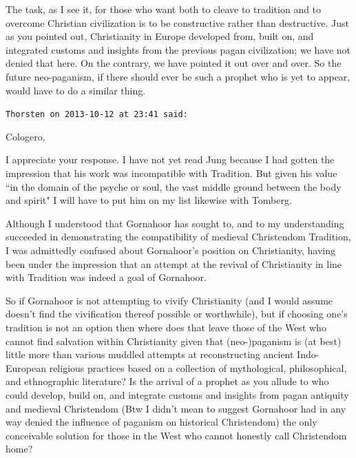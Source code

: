 \begin{footnotesize}
\begin{sffamily}
The task, as I see it, for those who want both to cleave to tradition and to overcome Christian civilization is to be
constructive rather than destructive. Just as you pointed out, Christianity in Europe developed from, built on, and
integrated customs and insights from the previous pagan civilization; we have not denied that here. On the contrary, we
have pointed it out over and over. So the future neo-paganism, if there should ever be such a prophet who is yet to
appear, would have to do a similar thing.


\hfill

\texttt{Thorsten on 2013-10-12 at 23:41 said: }

Cologero,

I appreciate your response. I have not yet read Jung because I had gotten the impression that his work was incompatible
with Tradition. But given his value ``in the domain of the psyche or soul, the vast middle ground between the body and
spirit" I will have to put him on my list likewise with Tomberg.

Although I understood that Gornahoor has sought to, and to my understanding succeeded in demonstrating the compatibility
of medieval Christendom Tradition, I was admittedly confused about Gornahoor's position on
Christianity, having been under the impression that an attempt at the revival of Christianity in line with Tradition
was indeed a goal of Gornahoor.

So if Gornahoor is not attempting to vivify Christianity (and I would assume doesn't find the
vivification thereof possible or worthwhile), but if choosing one's tradition is not an option
then where does that leave those of the West who cannot find salvation within Christianity given that (neo-)paganism is
(at best) little more than various muddled attempts at reconstructing ancient Indo-European religious practices based
on a collection of mythological, philosophical, and ethnographic literature? Is the arrival of a prophet as you allude
to who could develop, build on, and integrate customs and insights from pagan antiquity and medieval Christendom (Btw I
didn't mean to suggest Gornahoor had in any way denied the influence of paganism on historical
Christendom) the only conceivable solution for those in the West who cannot honestly call Christendom home?


\end{sffamily}
\end{footnotesize}

